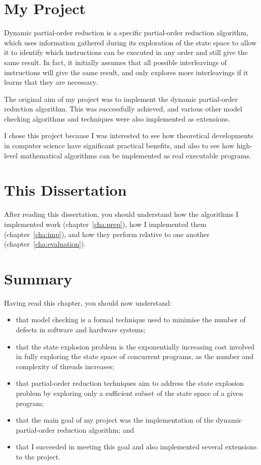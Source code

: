 \documentclass[12pt,a4paper,twoside,openright]{report}
\newenvironment{understandinglist}
	{\begin{itemize} \itemsep 0em}{\end{itemize}}
\begin{document}
\section{My Project}

Dynamic partial-order reduction is a
specific partial-order reduction algorithm,
which uses information gathered during its
exploration of the state space to allow it
to identify which instructions can be
executed in any order and still give the
same result. In fact, it initially assumes that
all possible interleavings of instructions will
give the same result, and only explores
more interleavings if it learns that
they are necessary.

The original aim of my project was to
implement the dynamic partial-order
reduction algorithm. This was successfully
achieved, and various other model checking
algorithms and techniques were also
implemented as extensions.

I chose this
project because I was interested to see
how theoretical developments in computer
science have significant practical benefits,
and also to see how high-level mathematical
algorithms can be implemented as real
executable programs.

\section{This Dissertation}

After reading this dissertation, you should
understand how the algorithms I implemented
work (chapter~\ref{cha:prep}),
how I implemented them (chapter~\ref{cha:imp}),
and how they perform relative to one another
(chapter~\ref{cha:evaluation}).

\section{Summary}
Having read this chapter,
you should now understand:
\begin{understandinglist}
	\item that model checking is a formal
	technique used to minimise the number
	of defects in software and hardware systems;
	\item that the state explosion problem is the
	exponentially increasing cost involved in
	fully exploring the state space of
	concurrent programs, as the number and
	complexity of threads increases;
	\item that partial-order reduction
	techniques aim to address the state explosion
	problem by exploring only a sufficient subset
	of the state space of a given program;
	\item that the main goal of my project was
	the implementation of the dynamic partial-order
	reduction algorithm; and
	\item that I succeeded in meeting this goal
	and also implemented several extensions to the
	project.
\end{understandinglist}
\end{document}
